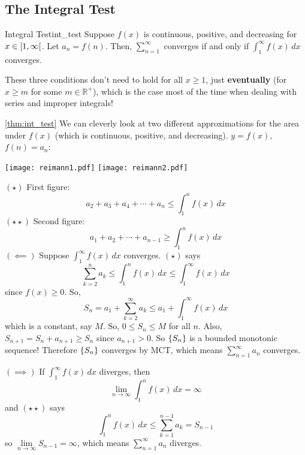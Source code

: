 \subsection*{The Integral Test}
\begin{Theorem}{Integral Test}{int_test}
    Suppose $ f(x) $ is continuous, positive, and decreasing
    for $ x\in\interval[open right]{1}{\infty} $. Let $ a_n=f(n) $. Then,
    $ \sum\limits_{n=1}^{\infty}  $ converges if and only if $ \int_{1}^{\infty} f(x)\, d{x} $
    converges.
\end{Theorem}
\begin{Remark}{}{}
    These three conditions don't need to hold for all $ x\geqslant 1 $, just
    \textbf{eventually} (for $ x\geqslant m $ for some $ m\in\mathbb{R}^+ $),
    which is the case most of the time when dealing with series and improper integrals!
\end{Remark}
\begin{Proof}{\ref{thm:int_test}}{}
    We can cleverly look at two different approximations for the area
    under $ f(x) $ (which is continuous, positive, and decreasing).  $ y=f(x) $,
    $ f(n)=a_n $:
    \begin{center}
        \texttt{[image: reimann1.pdf]}
        \texttt{[image: reimann2.pdf]}
    \end{center}
    $ (\star) $ First figure:
    \[ a_2+a_3+a_4+\cdots+a_n\leqslant \int_{1}^{n} f(x)\, d{x} \]
    $ (\star\star) $ Second figure:
    \[ a_1+a_2+\cdots+a_{n-1}\geqslant \int_{1}^{n} f(x)\, d{x} \]
    $ (\impliedby) $ Suppose $ \int_{1}^{\infty} f(x)\, d{x} $ converges. $ (\star) $
    says
    \[ \sum\limits_{k=2}^{n} a_k\leqslant \int_{1}^{n} f(x)\, d{x}\leqslant
        \int_{1}^{\infty} f(x)\, d{x}  \]
    since $ f(x)\geqslant 0 $. So,
    \[ S_n=a_1+\sum\limits_{k=2}^{\infty} a_k\leqslant a_1+\int_{1}^{\infty} f(x)\, d{x}  \]
    which is a constant, say $ M $. So, $ 0\leqslant S_n\leqslant M $ for all $ n $.
    Also, $ S_{n+1}=S_{n}+a_{n+1}\geqslant S_n $ since $ a_{n+1}>0 $. So
    $ \{S_n\} $ is a bounded monotonic sequence! Therefore
    $ \{S_n\} $ converges by MCT, which means $ \sum\limits_{n=1}^{\infty} a_n $
    converges.

    $ (\implies) $ If $ \int_{1}^{\infty} f(x)\, d{x}  $ diverges, then
    \[ \lim\limits_{{n} \to {\infty}} \int_{1}^{n} f(x)\, d{x} =\infty \]
    and $ (\star\star) $ says
    \[ \int_{1}^{n} f(x)\, d{x}\leqslant \sum\limits_{k=1}^{n-1} a_k=S_{n-1} \]
    so $ \lim\limits_{{n} \to {\infty}} S_{n-1}=\infty $, which means
    $ \sum\limits_{n=1}^{\infty} a_n $ diverges.
\end{Proof}

